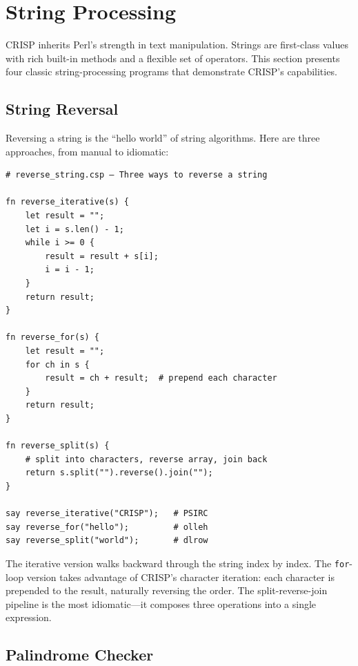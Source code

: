 \section{String Processing}

CRISP inherits Perl's strength in text manipulation. Strings are first-class values with rich built-in methods and a flexible set of operators. This section presents four classic string-processing programs that demonstrate CRISP's capabilities.

\subsection{String Reversal}

Reversing a string is the ``hello world'' of string algorithms. Here are three approaches, from manual to idiomatic:

\begin{tcolorbox}[colback=codebg, colframe=darkpurple, colbacktitle=darkpurple, title=\textbf{\textcolor{codegold}{String Reversal (reverse\_string.csp)}}, fonttitle=\bfseries, sharp corners]
\begin{lstlisting}
# reverse_string.csp — Three ways to reverse a string

fn reverse_iterative(s) {
    let result = "";
    let i = s.len() - 1;
    while i >= 0 {
        result = result + s[i];
        i = i - 1;
    }
    return result;
}

fn reverse_for(s) {
    let result = "";
    for ch in s {
        result = ch + result;  # prepend each character
    }
    return result;
}

fn reverse_split(s) {
    # split into characters, reverse array, join back
    return s.split("").reverse().join("");
}

say reverse_iterative("CRISP");   # PSIRC
say reverse_for("hello");         # olleh
say reverse_split("world");       # dlrow
\end{lstlisting}
\end{tcolorbox}

The iterative version walks backward through the string index by index. The \texttt{for}-loop version takes advantage of CRISP's character iteration: each character is prepended to the result, naturally reversing the order. The split-reverse-join pipeline is the most idiomatic—it composes three operations into a single expression.

\subsection{Palindrome Checker}

